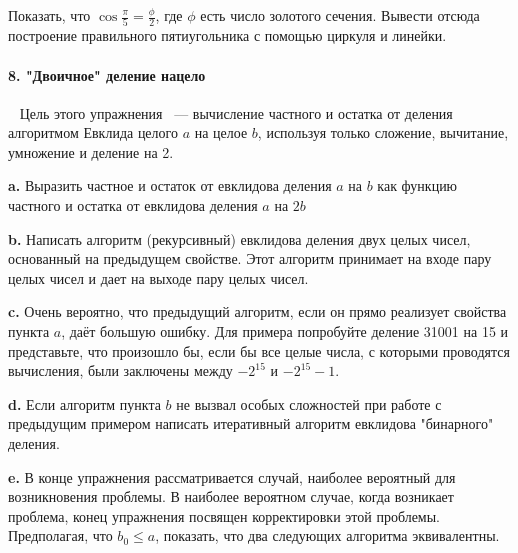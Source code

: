\documentclass{mai_book}
\begin{document}
Показать, что $ \cos{\frac{\pi}{5}}=\frac{\phi}{2}$, где $\phi$ есть число золотого сечения. Вывести отсюда построение правильного пятиугольника с помощью циркуля и линейки. 

\paragraph { 8. "Двоичное" деление нацело}\ \newline
Цель этого упражнения ~--- вычисление частного и остатка от деления алгоритмом Евклида целого $a$ на целое $b$, используя только сложение, вычитание, умножение и деление на 2. 

\textbf{ a.} Выразить частное и остаток от евклидова деления $a$ на $b$ как функцию частного и остатка от евклидова деления $a$ на $2b$

\textbf{ b.} Написать алгоритм (рекурсивный) евклидова деления двух целых чисел, основанный на предыдущем свойстве. Этот алгоритм принимает на входе пару целых чисел и дает на выходе пару целых чисел. 

\textbf{ c.} Очень вероятно, что предыдущий алгоритм, если он прямо реализует свойства пункта $a$, даёт большую ошибку. Для примера попробуйте деление 31001 на 15 и представьте, что произошло бы, если бы все целые числа, с которыми проводятся вычисления, были заключены между $-2^{15}$ и $-2^{15}-1$. 

\textbf{ d.} Если алгоритм пункта $b$ не вызвал особых сложностей при работе с предыдущим примером написать итеративный алгоритм евклидова "бинарного" деления. 

\textbf{ e.} В конце упражнения рассматривается случай, наиболее вероятный для возникновения проблемы. В наиболее вероятном случае, когда возникает проблема, конец упражнения посвящен корректировки этой проблемы.  Предполагая, что $b_{0}\leq{a}$, показать, что два следующих алгоритма эквивалентны. 

\newpage
	
\iffalse
\noindent 
\begin{minipage}[t]{50mm}\parindent=2em
 
 
\fbox{$b\leftarrow{b_{0}}$;$k\leftarrow{0}$;\linebreak
While(1) \{\linebreak
$b\leftarrow{2\times{b}}$;$ k\leftarrow{k+1}$;\linebreak
  If(b>a) \{\linebreak
       Break;\}\}}\linebreak
\end{minipage} 
\hfill 
\begin{minipage}[t]{50mm} 
\fbox{$b\leftarrow{b_{0}}$;$k\leftarrow{0}$;\linebreak
While(b<=a/2) \{\linebreak
      While(1)\{\linebreak
$b\leftarrow{2\times{b}}$;$ k\leftarrow{k+1}$;\}\}\linebreak
$b\leftarrow{2\times{b}}$;$ k\leftarrow{k+1}$;}\linebreak
\end{minipage}
\fi
\end{document}
